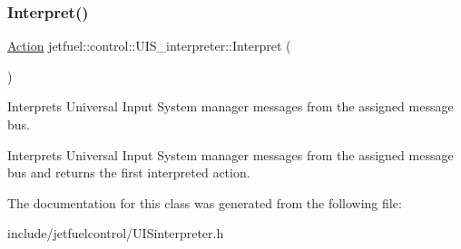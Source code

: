\subsubsection{\texorpdfstring{Interpret()}{Interpret()}}
{\footnotesize\ttfamily \hyperlink{structjetfuel_1_1control_1_1Action}{Action} jetfuel\+::control\+::\+U\+I\+S\+\_\+interpreter\+::\+Interpret (\begin{DoxyParamCaption}{ }\end{DoxyParamCaption})}



Interprets Universal Input System manager messages from the assigned message bus. 

Interprets Universal Input System manager messages from the assigned message bus and returns the first interpreted action. 

The documentation for this class was generated from the following file\+:\begin{DoxyCompactItemize}
\item 
include/jetfuelcontrol/U\+I\+Sinterpreter.\+h\end{DoxyCompactItemize}
